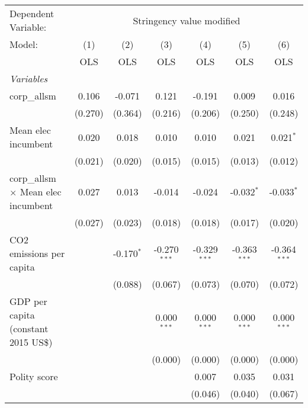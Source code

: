 
\begingroup
\centering
\begin{tabular}{lcccccc}
   \toprule
   Dependent Variable: & \multicolumn{6}{c}{Stringency value modified}\\
   Model:                                     & (1)     & (2)          & (3)            & (4)            & (5)            & (6)\\  
                                              &  OLS    & OLS          & OLS            & OLS            & OLS            & OLS\\  
   \midrule
   \emph{Variables}\\
   corp\_allsm                                & 0.106   & -0.071       & 0.121          & -0.191         & 0.009          & 0.016\\   
                                              & (0.270) & (0.364)      & (0.216)        & (0.206)        & (0.250)        & (0.248)\\   
   Mean elec incumbent                        & 0.020   & 0.018        & 0.010          & 0.010          & 0.021          & 0.021$^{*}$\\   
                                              & (0.021) & (0.020)      & (0.015)        & (0.015)        & (0.013)        & (0.012)\\   
   corp\_allsm $\times$ Mean elec incumbent   & 0.027   & 0.013        & -0.014         & -0.024         & -0.032$^{*}$   & -0.033$^{*}$\\   
                                              & (0.027) & (0.023)      & (0.018)        & (0.018)        & (0.017)        & (0.020)\\   
   CO2 emissions per capita                   &         & -0.170$^{*}$ & -0.270$^{***}$ & -0.329$^{***}$ & -0.363$^{***}$ & -0.364$^{***}$\\   
                                              &         & (0.088)      & (0.067)        & (0.073)        & (0.070)        & (0.072)\\   
   GDP per capita (constant 2015 US\$)        &         &              & 0.000$^{***}$  & 0.000$^{***}$  & 0.000$^{***}$  & 0.000$^{***}$\\   
                                              &         &              & (0.000)        & (0.000)        & (0.000)        & (0.000)\\   
   Polity score                               &         &              &                & 0.007          & 0.035          & 0.031\\   
                                              &         &              &                & (0.046)        & (0.040)        & (0.067)\\   

\end{tabular}
